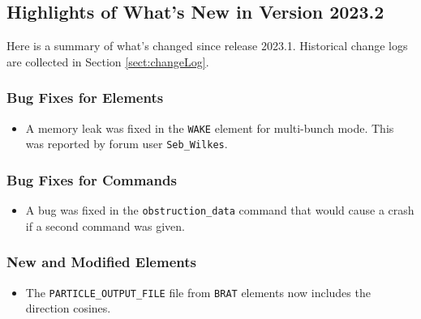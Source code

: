 \documentclass[11pt]{article}
\begin{document}
\subsection{Highlights of What's New in Version 2023.2}

Here is a summary of what's changed since release 2023.1.  Historical change logs are collected in Section
\ref{sect:changeLog}.

\subsubsection{Bug Fixes for Elements}

\begin{itemize}
\item A memory leak was fixed in the \verb|WAKE| element for multi-bunch mode. This was reported by
  forum user \verb|Seb_Wilkes|.
\end{itemize}

\subsubsection{Bug Fixes for Commands}
\begin{itemize}
\item A bug was fixed in the \verb|obstruction_data| command that would cause a crash if a second command
  was given.
\end{itemize}

\subsubsection{New and Modified Elements}
\begin{itemize}
\item The \verb|PARTICLE_OUTPUT_FILE| file from \verb|BRAT| elements now includes the direction cosines.
\end{itemize}
\end{document}
